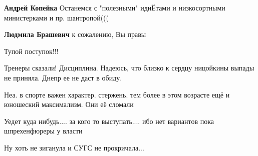 \begin{itemize}
\begin{itemize}
\textbf{Андрей Копейка} Останемся с "полезными" идиЁтами и низкосортными министерками и пр. шантропой(((



 
\textbf{Людмила Брашевич} к сожалению, Вы правы
\end{itemize}

 
Тупой поступок!!!

 
Тренеры сказали! Дисциплина. Надеюсь, что близко к сердцу ницойкины выпады не приняла. Днепр ее не даст в обиду.

 
Неа. в спорте важен характер. стержень. тем более в этом возрасте ещё и юношеский максимализм. Они её сломали

 
Уедет куда нибудь.... за кого то выступать.... ибо нет вариантов пока шпрехенфюреры у власти

 
Ну хоть не зиганула и СУГС не прокричала...

\begin{itemize}
 

\end{itemize}
\end{itemize}
